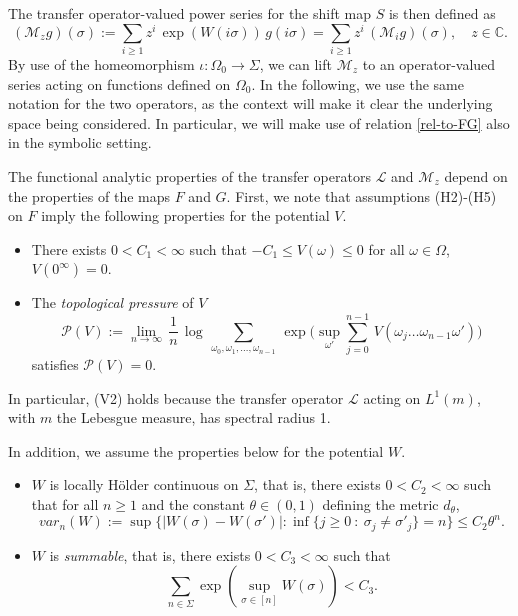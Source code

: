 \documentclass{amsart}
\theoremstyle{definition}
\theoremstyle{remark}
\theoremstyle{definition}
\numberwithin{equation}{section}
\newcommand{\C}{\mathbb C}
\newcommand{\CL}{{\mathcal L}}
\newcommand{\CM}{{\mathcal M}}
\newcommand{\CP}{{\mathcal P}}
\begin{document}
 The transfer operator-valued power series for the shift map $S$ is then defined as
\[
        (\CM_z g) (\sigma) := \sum\limits_{i\ge 1} z^i\, \exp( {W}(i\sigma)) \, g(i\sigma) = \sum\limits_{i \ge 1} z^i\, (\CM_{i}g)(\sigma), \quad z\in \C.
\]
By use of the homeomorphism $\iota : \Omega_{0} \longrightarrow \Sigma$, we can lift $\CM_z$ to an operator-valued series acting on functions defined on $\Omega_0$. In the following, we use the same notation for the two operators, as the context will make it clear the underlying space being considered. In particular, we will make use of  relation \eqref{rel-to-FG} also in the symbolic setting.

The functional analytic properties of the transfer operators $\CL$ and $\CM_z$ depend on the properties of the maps $F$ and $G$. First, we note that assumptions (H2)-(H5) on $F$ imply the following properties for the potential $V$.
\begin{itemize}
\item[(V1)] There exists $0 < C_1 < \infty$ such that $-C_1 \le V(\omega) \le 0$ for all $\omega \in \Omega$, $V(0^{\infty}) = 0$.
\item[(V2)] The \emph{topological pressure} of $V$
\begin{equation} \label{pressure}
\CP(V) := \lim_{n\to \infty}\, \frac 1n\, \log\, \sum_{\omega_0,\omega_1,\dots, \omega_{n-1}}\, \exp \Big( \sup_{\omega'} \sum_{j=0}^{n-1}\, V(\omega_j\dots\omega_{n-1}\omega') \Big)
\end{equation}
satisfies $\CP(V)=0$.
\end{itemize}
In particular, (V2) holds because the transfer operator $\CL$ acting on $L^1(m)$, with $m$ the Lebesgue measure, has spectral radius 1.

In addition, we assume the properties below for the potential $W$.

\begin{itemize}
    \item[(W1)] $W$ is locally H\"older continuous on $\Sigma$, that is, there exists $0 < C_2 < \infty$ such that for all $n \ge 1$ and the constant $\theta \in (0,1)$ defining the metric $d_\theta$,
    \[ 
        var_{n}(W) := \sup \lbrace |W(\sigma) - W(\sigma')|: \inf \{ j \ge 0 \ : \ \sigma_{j} \neq \sigma'_{j} \} = n \rbrace \le C_2 \theta^{n}. 
    \]
   \item[(W2)] $W$ is {\it summable}, that is, there exists $0 < C_3 < \infty$ such that 
    \[ 
        \sum\limits_{n \in \Sigma} \exp \left( \sup\limits_{\sigma \in [n]} W(\sigma) \right) < C_{3}.
    \] 
\end{itemize}
 
\end{document}
